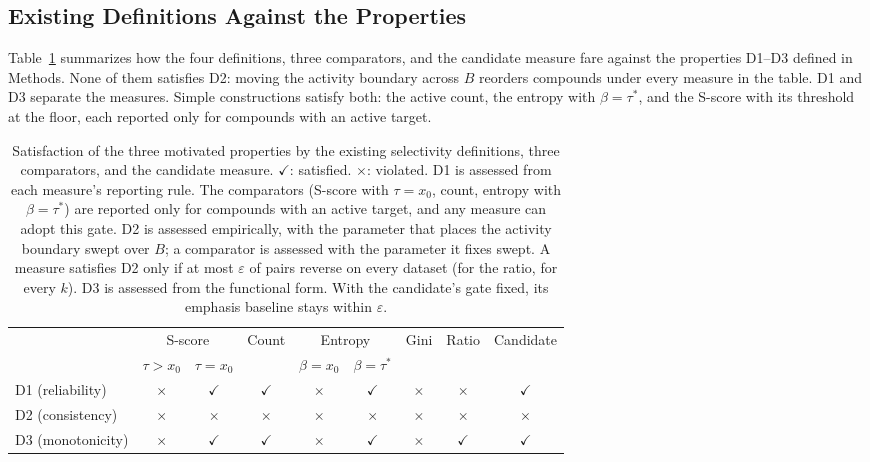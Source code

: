 \subsection{Existing Definitions Against the Properties}
\label{sec:desiderata}

Table~\ref{tab:desiderata} summarizes how the four definitions, three
comparators, and the candidate measure fare against the properties D1--D3
defined in Methods. None of them satisfies D2: moving the activity boundary
across $B$ reorders compounds under every measure in the table. D1 and D3
separate the measures. Simple constructions satisfy both: the active count, the
entropy with $\beta = \tau^*$, and the S-score with its threshold at the floor,
each reported only for compounds with an active target.

\begin{table}[h]
  \centering
  \caption{Satisfaction of the three motivated properties by the existing
           selectivity definitions, three comparators, and the candidate
           measure. $\checkmark$: satisfied. $\times$: violated. D1 is assessed
           from each measure's reporting rule. The comparators (S-score with
           $\tau = x_0$, count, entropy with $\beta = \tau^*$) are reported only
           for compounds with an active target, and any measure can adopt this
           gate. D2 is assessed empirically, with the parameter that places the
           activity boundary swept over $B$; a comparator is assessed with the
           parameter it fixes swept. A measure satisfies D2 only if at most
           $\varepsilon$ of pairs reverse on every dataset (for the ratio, for
           every $k$). D3 is assessed from the functional form. With the
           candidate's gate fixed, its emphasis baseline stays within
           $\varepsilon$.}
  \label{tab:desiderata}
  \small
  \setlength{\tabcolsep}{3.5pt}
  \begin{tabular}{lcccccccc}
    \toprule
    & \multicolumn{2}{c}{S-score} & Count & \multicolumn{2}{c}{Entropy} & Gini & Ratio & Candidate \\
    \cmidrule(lr){2-3}\cmidrule(lr){5-6}
    & $\tau > x_0$ & $\tau = x_0$ & & $\beta = x_0$ & $\beta = \tau^*$ & & & \\
    \midrule
    D1 (reliability)   & $\times$ & $\checkmark$ & $\checkmark$ & $\times$ & $\checkmark$ & $\times$ & $\times$     & $\checkmark$ \\
    D2 (consistency)   & $\times$ & $\times$     & $\times$     & $\times$ & $\times$     & $\times$ & $\times$     & $\times$ \\
    D3 (monotonicity)  & $\times$ & $\checkmark$ & $\checkmark$ & $\times$ & $\checkmark$ & $\times$ & $\checkmark$ & $\checkmark$ \\
    \bottomrule
  \end{tabular}
\end{table}

